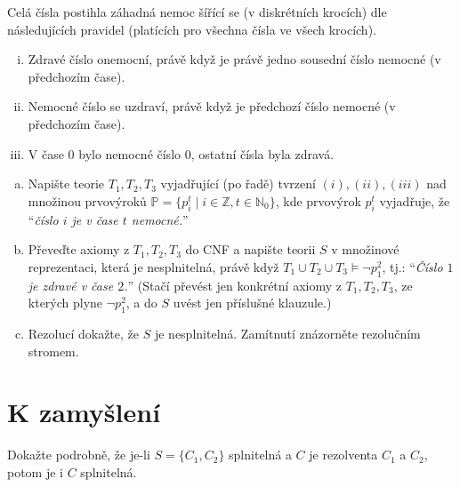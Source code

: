 \begin{problem}

    Celá čísla postihla záhadná nemoc šířící se (v diskrétních krocích) dle následujících pravidel (platících pro všechna čísla ve všech krocích).
    \begin{enumerate}[(i)]\it
        \item Zdravé číslo onemocní, právě když je právě jedno sousední číslo nemocné (v předchozím čase).
        \item Nemocné číslo se uzdraví, právě když je předchozí číslo nemocné (v předchozím čase).
        \item V čase $0$ bylo nemocné číslo $0$, ostatní čísla byla zdravá.
    \end{enumerate}
    \begin{enumerate}[(a)]
        \item Napište teorie $T_1, T_2, T_3$ vyjadřující (po řadě) tvrzení $(i), (ii), (iii)$ nad množinou prvovýroků $\mathbb{P}=\{p_i^t \mid i\in\mathbb{Z}, t\in\mathbb{N}_0\}$, kde prvovýrok $p_i^t$ vyjadřuje, že ``{\it číslo $i$ je v čase $t$ nemocné.}''
        \item Převeďte axiomy z $T_1, T_2, T_3$ do CNF a napište teorii $S$ v množinové reprezentaci, která je nesplnitelná, právě když $T_1 \cup T_2 \cup T_3 \models \neg p_1^2$, tj.: ``{\it Číslo $1$ je zdravé v čase $2$.}'' (Stačí převést jen konkrétní axiomy z $T_1,T_2,T_3$, ze kterých plyne $\neg p_1^2$, a do $S$ uvést jen příslušné klauzule.)
        \item Rezolucí dokažte, že $S$ je nesplnitelná. Zamítnutí znázorněte rezolučním stromem.
    \end{enumerate}

\end{problem}

        
\section*{K zamyšlení}


\begin{problem}
    Dokažte podrobně, že je-li $S=\{C_1,C_2\}$ splnitelná a $C$ je rezolventa $C_1$ a $C_2$, potom je i $C$ splnitelná.
\end{problem}
